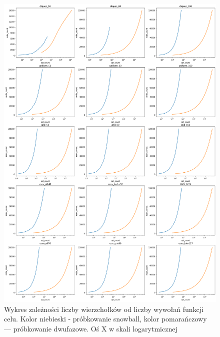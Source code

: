 \begin{figure}[]
    \centering
    \includegraphics[width=\textwidth]{chapters/experiments/img/opt_nodes.png}
    \caption{Wykres zależności liczby wierzchołków od liczby wywołań funkcji celu.
        Kolor niebieski - próbkowanie snowball, kolor pomarańczowy --- próbkowanie dwufazowe.
        Oś X w skali logarytmicznej}
    \label{fig:main_opt_nodes}
\end{figure}

